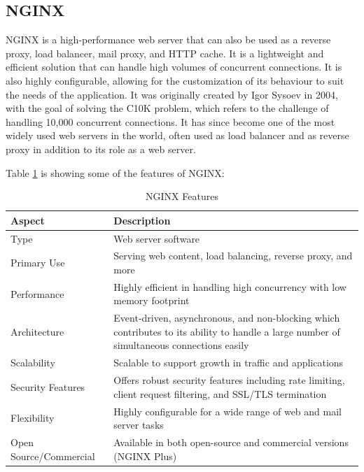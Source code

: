 \subsection{NGINX}
NGINX is a high-performance web server that can also be used as a reverse proxy, load balancer, mail proxy, and HTTP cache. It is a lightweight and efficient solution that can handle high volumes of concurrent connections. It is also highly configurable, allowing for the customization of its behaviour to suit the needs of the application.
It was originally created by Igor Sysoev in 2004, with the goal of solving the C10K problem, which refers to the challenge of handling 10,000 concurrent connections. \cite{nginx} It has since become one of the most widely used web servers in the world, often used as load balancer and as reverse proxy in addition to its role as a web server.

Table \ref{tab:ngnix} is showing some of the features of NGINX\cite{nginx}:

\begin{table}[H]
    \centering
    \begin{tabularx}{\textwidth}{|l|X|}
        \hline
    \textbf{Aspect} & \textbf{Description} \\
    \hline
    Type & Web server software \\
    \hline
    Primary Use & Serving web content, load balancing, reverse proxy, and more \\
    \hline
    Performance & Highly efficient in handling high concurrency with low memory footprint \\
    \hline
    Architecture & Event-driven, asynchronous, and non-blocking which contributes to its ability to handle a large number of simultaneous connections easily \\
    \hline
    Scalability & Scalable to support growth in traffic and applications \\
    \hline
    Security Features & Offers robust security features including rate limiting, client request filtering, and SSL/TLS termination \\
    \hline
    Flexibility & Highly configurable for a wide range of web and mail server tasks \\
    \hline
    Open Source/Commercial & Available in both open-source and commercial versions (NGINX Plus) \\
    \hline
\end{tabularx}
\label{tab:ngnix}
\caption{NGINX Features}
\end{table}

